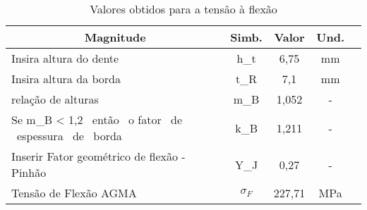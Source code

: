 \begin{table}
\centering
\caption{\label{tab:6} Valores obtidos para a tensâo à flexão}
\begin{tabular}{l c c c c}
\hline
\multicolumn{1}{c}{\textbf{Magnitude}}           & \textbf{Simb.} & \textbf{Valor} & \textbf{Und.} \\ \hline
Insira altura do dente                           & h_t             & 6,75           & mm            \\
Insira altura da borda                           & t_R             & 7,1            & mm            \\
relação de alturas                               & m_B             & 1,052          & -             \\
Se m_B < 1,2 \ então \ o fator \ de \ espessura \ de \ borda & k_B             & 1,211          & -             \\
Inserir Fator geométrico de flexão - Pinhão      & Y_J             & 0,27           & -             \\
Tensão de Flexão AGMA                            & $\sigma_F$       & 227,71         & MPa     \\ \hline     
\end{tabular}
\end{table}
